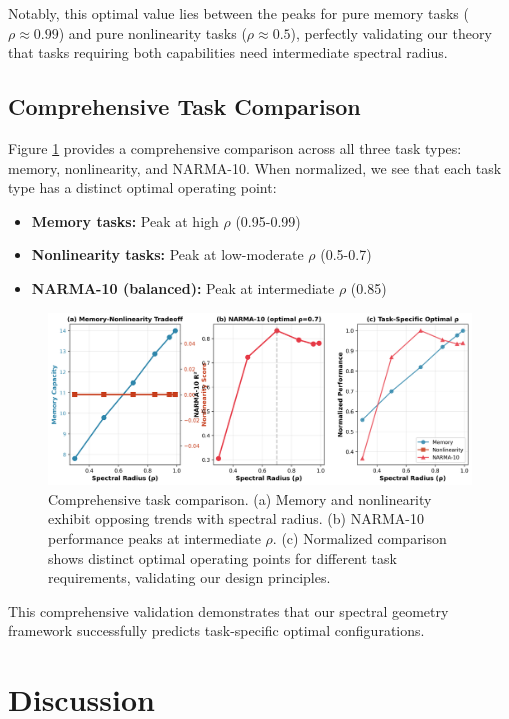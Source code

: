 \documentclass{article}
\begin{document}
Notably, this optimal value lies between the peaks for pure memory tasks ($\rho \approx 0.99$) and pure nonlinearity tasks ($\rho \approx 0.5$), perfectly validating our theory that tasks requiring both capabilities need intermediate spectral radius.

\subsection{Comprehensive Task Comparison}

Figure \ref{fig:summary} provides a comprehensive comparison across all three task types: memory, nonlinearity, and NARMA-10. When normalized, we see that each task type has a distinct optimal operating point:

\begin{itemize}
    \item \textbf{Memory tasks:} Peak at high $\rho$ (0.95-0.99)
    \item \textbf{Nonlinearity tasks:} Peak at low-moderate $\rho$ (0.5-0.7)
    \item \textbf{NARMA-10 (balanced):} Peak at intermediate $\rho$ (0.85)
\end{itemize}

\begin{figure}[htbp]
\centering
\includegraphics[width=\textwidth]{fig7_comprehensive_summary.png}
\caption{Comprehensive task comparison. (a) Memory and nonlinearity exhibit opposing trends with spectral radius. (b) NARMA-10 performance peaks at intermediate $\rho$. (c) Normalized comparison shows distinct optimal operating points for different task requirements, validating our design principles.}
\label{fig:summary}
\end{figure}

This comprehensive validation demonstrates that our spectral geometry framework successfully predicts task-specific optimal configurations.

\section{Discussion}
\label{sec:discussion}
\end{document}
